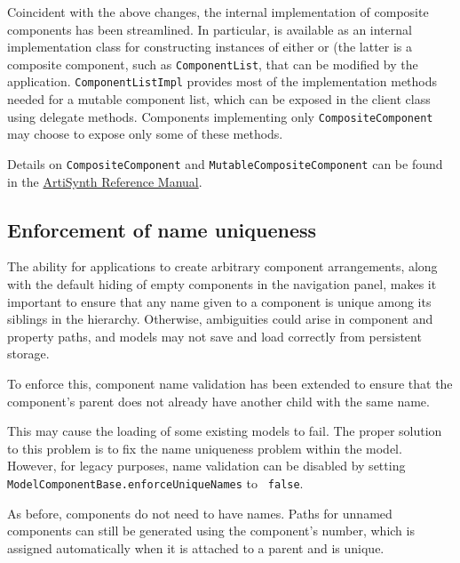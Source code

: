 \documentclass{article}
\begin{document}

Coincident with the above changes, the internal implementation of
composite components has been streamlined. In particular,
 is available as an internal
implementation class for constructing instances of either
 or
 (the latter is a composite
component, such as {\tt ComponentList}, that can be modified by the
application.  {\tt ComponentListImpl} provides most of the
implementation methods needed for a mutable component list, which can
be exposed in the client class using delegate methods.  Components
implementing only {\tt CompositeComponent} may choose to expose only
some of these methods.

Details on {\tt CompositeComponent} and {\tt MutableCompositeComponent}
can be found in the 
\href{http://www.artisynth.org/doc/html/artisynth/artisynth.html}%
{ArtiSynth Reference Manual}.

\subsection*{Enforcement of name uniqueness}

The ability for applications to create arbitrary component
arrangements, along with the default hiding of empty components in the
navigation panel, makes it important to ensure that any name given to
a component is unique among its siblings in the hierarchy.  Otherwise,
ambiguities could arise in component and property paths, and models
may not save and load correctly from persistent storage.

To enforce this, component name validation has been extended to ensure
that the component's parent does not already have another child with
the same name.

\begin{sideblock}
This may cause the loading of some existing models to fail. The proper
solution to this problem is to fix the name uniqueness problem within
the model. However, for legacy purposes, name validation can be
disabled by setting {\tt ModelComponentBase.enforceUniqueNames} to {\tt
false}. 
\end{sideblock}

As before, components do not need to have names.  Paths for unnamed
components can still be generated using the component's number, which
is assigned automatically when it is attached to a parent and is
unique.
\end{document}
